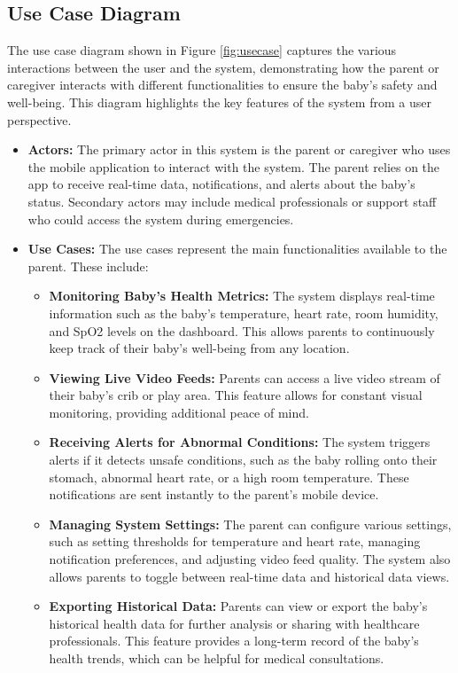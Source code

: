 \documentclass[12pt,a4paper]{report}
\begin{document}
\subsection{Use Case Diagram}
The use case diagram shown in Figure \ref{fig:usecase} captures the various interactions between the user and the system, demonstrating how the parent or caregiver interacts with different functionalities to ensure the baby’s safety and well-being. This diagram highlights the key features of the system from a user perspective.
\begin{itemize}
  \item \textbf{Actors:} The primary actor in this system is the parent or caregiver who uses the mobile application to interact with the system. The parent relies on the app to receive real-time data, notifications, and alerts about the baby's status. Secondary actors may include medical professionals or support staff who could access the system during emergencies.
  \item \textbf{Use Cases:} The use cases represent the main functionalities available to the parent. These include:
  \begin{itemize}
    \item \textbf{Monitoring Baby’s Health Metrics:} The system displays real-time information such as the baby's temperature, heart rate, room humidity, and SpO2 levels on the dashboard. This allows parents to continuously keep track of their baby’s well-being from any location.
    \item \textbf{Viewing Live Video Feeds:} Parents can access a live video stream of their baby’s crib or play area. This feature allows for constant visual monitoring, providing additional peace of mind.
    \item \textbf{Receiving Alerts for Abnormal Conditions:} The system triggers alerts if it detects unsafe conditions, such as the baby rolling onto their stomach, abnormal heart rate, or a high room temperature. These notifications are sent instantly to the parent's mobile device.
    \item \textbf{Managing System Settings:} The parent can configure various settings, such as setting thresholds for temperature and heart rate, managing notification preferences, and adjusting video feed quality. The system also allows parents to toggle between real-time data and historical data views.
    \item \textbf{Exporting Historical Data:} Parents can view or export the baby’s historical health data for further analysis or sharing with healthcare professionals. This feature provides a long-term record of the baby’s health trends, which can be helpful for medical consultations.
  \end{itemize}
\end{itemize}
\end{document}

